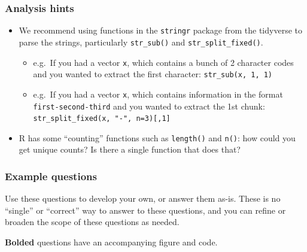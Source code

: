 \documentclass[
  letterpaper,
  DIV=11,
  numbers=noendperiod]{scrreprt}
\begin{document}
\begin{tcolorbox}[enhanced jigsaw, left=2mm, colframe=quarto-callout-tip-color-frame, leftrule=.75mm, opacitybacktitle=0.6, toptitle=1mm, title=\textcolor{quarto-callout-tip-color}{\faLightbulb}\hspace{0.5em}{Tip}, opacityback=0, coltitle=black, colbacktitle=quarto-callout-tip-color!10!white, breakable, colback=white, titlerule=0mm, bottomrule=.15mm, arc=.35mm, bottomtitle=1mm, rightrule=.15mm, toprule=.15mm]

\hypertarget{analysis-hints-2}{%
\subsubsection{Analysis hints}\label{analysis-hints-2}}

\begin{itemize}
\item
  We recommend using functions in the \texttt{stringr} package from the
  tidyverse to parse the strings, particularly \texttt{str\_sub()} and
  \texttt{str\_split\_fixed()}.

  \begin{itemize}
  \item
    e.g.~If you had a vector \texttt{x}, which contains a bunch of 2
    character codes and you wanted to extract the first character:
    \texttt{str\_sub(x,\ 1,\ 1)}
  \item
    e.g.~If you had a vector \texttt{x}, which contains information in
    the format \texttt{first-second-third} and you wanted to extract the
    1st chunk: \texttt{str\_split\_fixed(x,\ "-",\ n=3){[},1{]}}
  \end{itemize}
\item
  R has some ``counting'' functions such as \texttt{length()} and
  \texttt{n()}: how could you get unique counts? Is there a single
  function that does that?
\end{itemize}

\hypertarget{example-questions-2}{%
\subsubsection{Example questions}\label{example-questions-2}}

Use these questions to develop your own, or answer them as-is. These is
no ``single'' or ``correct'' way to answer to these questions, and you
can refine or broaden the scope of these questions as needed.

\textbf{Bolded} questions have an accompanying figure and code.


\end{tcolorbox}
\end{document}
